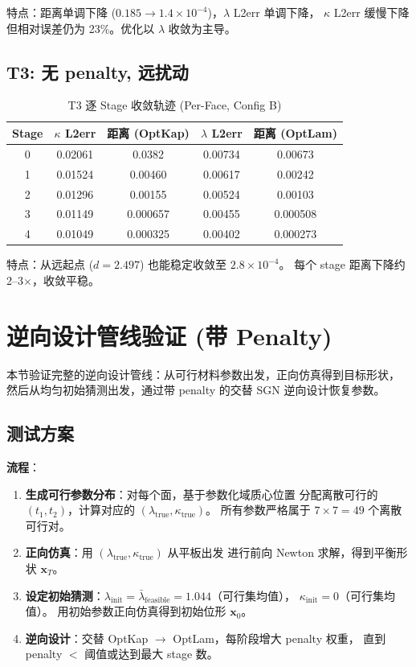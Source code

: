 \documentclass[12pt,a4paper]{article}
\begin{document}
特点：距离单调下降 ($0.185 \to 1.4 \times 10^{-4}$)，$\lambda$ L2err 单调下降，
$\kappa$ L2err 缓慢下降但相对误差仍为 23\%。优化以 $\lambda$ 收敛为主导。

\subsection{T3: 无 penalty, 远扰动}

\begin{table}[H]
\centering
\caption{T3 逐 Stage 收敛轨迹 (Per-Face, Config B)}
\begin{tabular}{ccccc}
\toprule
Stage & $\kappa$ L2err & 距离 (OptKap) & $\lambda$ L2err & 距离 (OptLam) \\
\midrule
0 & 0.02061 & 0.0382 & 0.00734 & 0.00673 \\
1 & 0.01524 & 0.00460 & 0.00617 & 0.00242 \\
2 & 0.01296 & 0.00155 & 0.00524 & 0.00103 \\
3 & 0.01149 & 0.000657 & 0.00455 & 0.000508 \\
4 & 0.01049 & 0.000325 & 0.00402 & 0.000273 \\
\bottomrule
\end{tabular}
\end{table}

特点：从远起点 ($d=2.497$) 也能稳定收敛至 $2.8 \times 10^{-4}$。
每个 stage 距离下降约 2--3$\times$，收敛平稳。

\section{逆向设计管线验证 (带 Penalty)}

本节验证完整的逆向设计管线：从可行材料参数出发，正向仿真得到目标形状，
然后从均匀初始猜测出发，通过带 penalty 的交替 SGN 逆向设计恢复参数。

\subsection{测试方案}

\textbf{流程}：
\begin{enumerate}
    \item \textbf{生成可行参数分布}：对每个面，基于参数化域质心位置
    分配离散可行的 $(t_1, t_2)$，计算对应的 $(\lambda_\text{true}, \kappa_\text{true})$。
    所有参数严格属于 $7 \times 7 = 49$ 个离散可行对。
    \item \textbf{正向仿真}：用 $(\lambda_\text{true}, \kappa_\text{true})$ 从平板出发
    进行前向 Newton 求解，得到平衡形状 $\mathbf{x}_T$。
    \item \textbf{设定初始猜测}：$\lambda_\text{init} = \bar{\lambda}_\text{feasible} = 1.044$（可行集均值），
    $\kappa_\text{init} = 0$（可行集均值）。
    用初始参数正向仿真得到初始位形 $\mathbf{x}_0$。
    \item \textbf{逆向设计}：交替 OptKap $\to$ OptLam，每阶段增大 penalty 权重，
    直到 penalty $<$ 阈值或达到最大 stage 数。
\end{enumerate}
\end{document}
